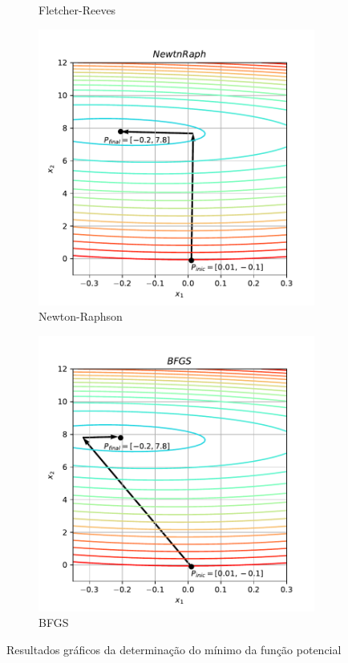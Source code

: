 \documentclass[10pt, a4paper]{article}
\begin{document}
\begin{figure}[htpb]
\begin{subfigure}[b]{0.32\textwidth}
    \caption{Fletcher-Reeves}
    \label{fig:q2a_fletchrvs}
  \end{subfigure}
  \hfill
  \begin{subfigure}[b]{0.32\textwidth}
    \centering
    \includegraphics[width=\textwidth]{images/q2a_NewtnRaph.pdf}
    \caption{Newton-Raphson}
    \label{fig:q2a_newtnraph}
  \end{subfigure}
  \hfill
  \begin{subfigure}[b]{0.32\textwidth}
    \centering
    \includegraphics[width=\textwidth]{images/q2a_BFGS.pdf}
    \caption{BFGS}
    \label{fig:q2a_bfgs}
  \end{subfigure}
     \caption{Resultados gráficos da determinação do mínimo da função potencial}
     \label{fig:q2a}
\end{figure}
\end{document}
